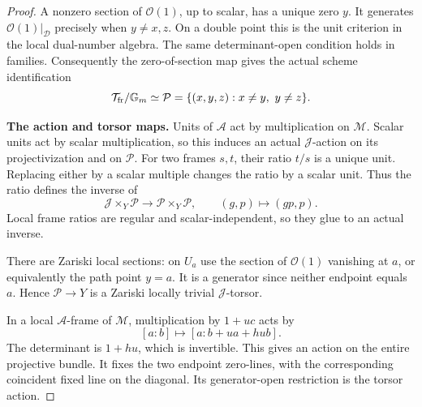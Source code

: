 \begin{proof}
A nonzero section of \(\mathcal O(1)\), up to scalar,
has a unique zero \(y\).
It generates \(\mathcal O(1)|_{\mathscr D}\) precisely
when \(y\ne x,z\).
On a double point this is the unit criterion in
the local dual-number algebra.
The same determinant-open condition holds in families.
Consequently the zero-of-section map gives the
actual scheme identification
\begin{equation}\label{eq:variableQuotientActualPath}
 \mathcal T_{\rm fr}/\mathbb G_m
       \simeq\mathcal P
       =\{(x,y,z):x\ne y,\ y\ne z\}.
\end{equation}

\par\smallskip\noindent\textbf{The action and torsor maps.}\quad
Units of \(\mathcal A\) act by multiplication on
\(\mathcal M\). Scalar units act by scalar multiplication,
so this induces an actual \(\mathcal J\)-action on
its projectivization and on \(\mathcal P\).
For two frames \(s,t\), their ratio \(t/s\) is a
unique unit. Replacing either by a scalar multiple
changes the ratio by a scalar unit.
Thus the ratio defines the inverse of
\begin{equation}\label{eq:variableQuotientTorsorMap}
 \mathcal J\times_Y\mathcal P
    \longrightarrow\mathcal P\times_Y\mathcal P,
             \qquad(g,p)\longmapsto(gp,p).
\end{equation}
Local frame ratios are regular and scalar-independent,
so they glue to an actual inverse.

There are Zariski local sections: on \(U_a\) use
the section of \(\mathcal O(1)\) vanishing at \(a\),
or equivalently the path point \(y=a\).
It is a generator since neither endpoint equals \(a\).
Hence \(\mathcal P\to Y\) is a Zariski locally
trivial \(\mathcal J\)-torsor.

In a local \(\mathcal A\)-frame of \(\mathcal M\),
multiplication by \(1+uc\) acts by
\begin{equation}\label{eq:variableQuotientProjectiveAction}
                  [a:b]\longmapsto[a:b+ua+hub].
\end{equation}
The determinant is \(1+hu\), which is invertible.
This gives an action on the entire projective bundle.
It fixes the two endpoint zero-lines, with the
corresponding coincident fixed line on the diagonal.
Its generator-open restriction is the torsor action.


\end{proof}
